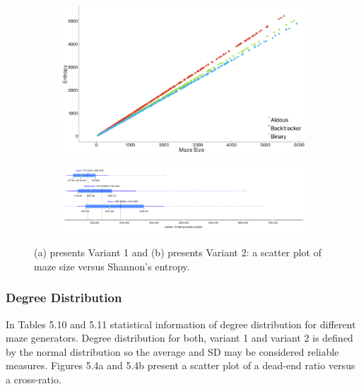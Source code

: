\begin{figure}[!h]
    \centering
    \begin{subfigure}[!h]{0.7\textwidth}
       \includegraphics[width=1\linewidth]{entropy_variant1.png}
       \caption{}
    \end{subfigure}
    \begin{subfigure}[!h]{0.7\textwidth}
       \includegraphics[width=1\linewidth]{entropy_variant2.png}
       \caption{}
    \end{subfigure}
    \caption{(a) presents Variant 1 and (b) presents Variant 2: a scatter plot of maze size versus Shannon's entropy.}
    \end{figure}%
\newpage
\subsubsection{Degree Distribution}  
In Tables 5.10 and 5.11 statistical information of degree distribution for different maze generators. Degree distribution for both, variant 1 and variant 2
is defined by the normal distribution so the average and SD may be considered reliable measures.
Figures 5.4a and 5.4b present a scatter plot of a dead-end ratio versus a cross-ratio.

